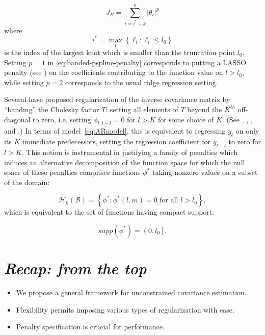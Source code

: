\documentclass[12pt]{article}
\theoremstyle{definition}
\begin{document}
\begin{equation} \label{eq:banded-pspline-penalty}
J_{B} = \sum_{ i=i^* -k }^n \vert \theta_i \vert^p
\end{equation}
\noindent
where
\[
i^* = \max\limits_{i} \left\{ \ell_i: \ell_i \le l_0 \right\}
\]
is the index of the largest knot which is smaller than the truncation point $l_0$. Setting $p=1$ in \ref{eq:banded-pspline-penalty} corresponds to putting a LASSO penalty (see \citet{tibshirani1996regression}) on the coefficients contributing to the function value on $l > l_0$, while setting $p=2$ corresponds to the usual ridge regression setting. 


Several have proposed regularization of the inverse covariance matrix by ``banding'' the Cholesky factor $T$: setting all elements of $T$ beyond the $K^{th}$ off-diagonal to zero, i.e. setting $\phi_{t,t-l}=0$ for $l > K$ for some choice of $K$.  (See \cite{pourahmadi1999joint}, \citet{wu2003nonparametric}, \cite{bickel2008regularized}, and \cite{huang2007estimation}.) In terms of model~\ref{eq:ARmodel}, this is equivalent to regressing $y_t$  on only its $K$ immediate predecessors, setting the regression coefficient for $y_{t-l}$ to zero for $l>K$.  This notion is instrumental in justifying a family of penalties which induces an alternative decomposition of the function space for which the null space of these penalties comprises functions $\phi^*$ taking nonzero values on a subset of the domain:

\begin{equation} \label{eq:banded-penalty-nullspace}
\mathcal{H}_0\left(\mathcal{B}\right) = \left\{ \phi^*: \phi^*\left(l,m\right) = 0 \mbox{ for all } l > l_0 \right\},
\end{equation}
\noindent
which is equivalent to the set of functions having compact support:

\[
supp\left( \phi^* \right) = \left(0,l_0\right].
\]

 



 
\section{\emph{Recap: from the top}}

\begin{itemize}
\item We propose a general framework for unconstrained covariance estimation.
\item Flexibility permits imposing various types of regularization with ease. 
\item Penalty specification is crucial for performance.
\end{itemize}
\end{document}
